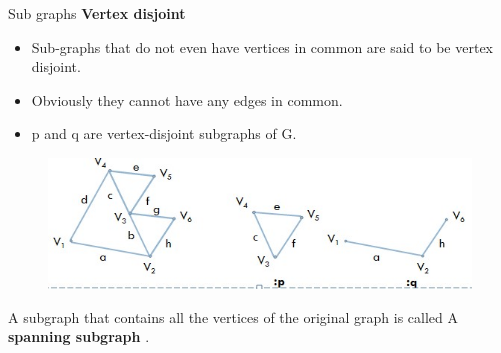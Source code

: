 \documentclass{beamer}
\begin{document}
\begin{frame}{Sub graphs}
	\textbf{Vertex disjoint}
	\begin{itemize}
		\item Sub-graphs that do not even have vertices in common are said to be vertex  disjoint.
		\item Obviously they cannot have any edges in common.
		\item p and q are vertex-disjoint subgraphs of G.
	\end{itemize}
	\begin{figure}
	\includegraphics[scale=.6]{img/m28}
\end{figure}
  A subgraph that contains all the vertices of the original graph is called A \textbf{spanning subgraph } .
\end{frame}
\end{document}
